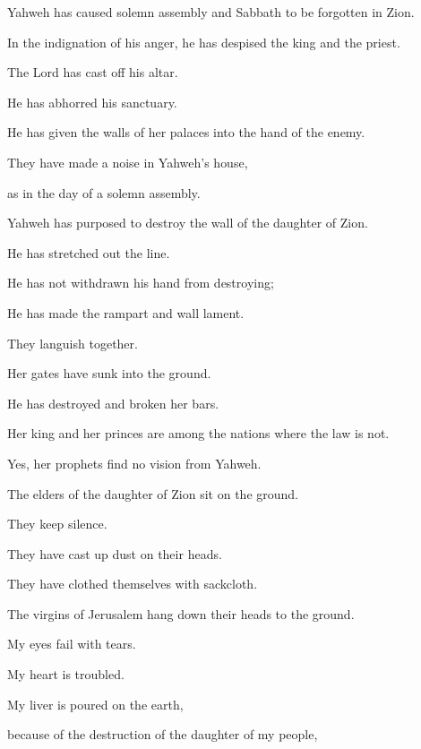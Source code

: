 {\par }{\QB Yahweh has caused solemn assembly and Sabbath to be forgotten in Zion.
\par }{\QB In the indignation of his anger, he has despised the king and the priest.
\par }{\BB \par }{\Q {}The Lord has cast off his altar.
\par }{\QB He has abhorred his sanctuary.
\par }{\Q He has given the walls of her palaces into the hand of the enemy.
\par }{\QB They have made a noise in Yahweh’s house,
\par }{\QB as in the day of a solemn assembly.
\par }{\BB \par }{\Q {}Yahweh has purposed to destroy the wall of the daughter of Zion.
\par }{\QB He has stretched out the line.
\par }{\QB He has not withdrawn his hand from destroying;
\par }{\Q He has made the rampart and wall lament.
\par }{\QB They languish together.
\par }{\BB \par }{\Q {}Her gates have sunk into the ground.
\par }{\QB He has destroyed and broken her bars.
\par }{\Q Her king and her princes are among the nations where the law is not.
\par }{\QB Yes, her prophets find no vision from Yahweh.
\par }{\BB \par }{\Q {}The elders of the daughter of Zion sit on the ground.
\par }{\QB They keep silence.
\par }{\Q They have cast up dust on their heads.
\par }{\QB They have clothed themselves with sackcloth.
\par }{\QB The virgins of Jerusalem hang down their heads to the ground.
\par }{\BB \par }{\Q {}My eyes fail with tears.
\par }{\QB My heart is troubled.
\par }{\Q My liver is poured on the earth,
\par }{\QB because of the destruction of the daughter of my people,
}

